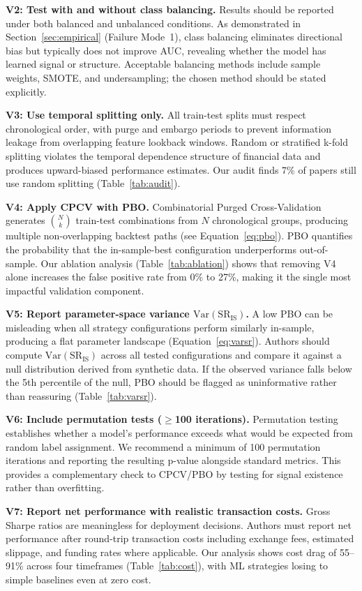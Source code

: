 \documentclass[preprint,12pt,authoryear]{elsarticle}
\begin{document}
\textbf{V2: Test with and without class balancing.}
Results should be reported under both balanced and unbalanced conditions. As demonstrated in Section~\ref{sec:empirical} (Failure Mode~1), class balancing eliminates directional bias but typically does not improve AUC, revealing whether the model has learned signal or structure. Acceptable balancing methods include sample weights, SMOTE, and undersampling; the chosen method should be stated explicitly.

\textbf{V3: Use temporal splitting only.}
All train-test splits must respect chronological order, with purge and embargo periods to prevent information leakage from overlapping feature lookback windows. Random or stratified k-fold splitting violates the temporal dependence structure of financial data and produces upward-biased performance estimates. Our audit finds 7\% of papers still use random splitting (Table~\ref{tab:audit}).

\textbf{V4: Apply CPCV with PBO.}
Combinatorial Purged Cross-Validation generates $\binom{N}{k}$ train-test combinations from $N$ chronological groups, producing multiple non-overlapping backtest paths (see Equation~\ref{eq:pbo}). PBO quantifies the probability that the in-sample-best configuration underperforms out-of-sample. Our ablation analysis (Table~\ref{tab:ablation}) shows that removing V4 alone increases the false positive rate from 0\% to 27\%, making it the single most impactful validation component.

\textbf{V5: Report parameter-space variance $\mathrm{Var}(\mathrm{SR}_{\mathrm{IS}})$.}
A low PBO can be misleading when all strategy configurations perform similarly in-sample, producing a flat parameter landscape (Equation~\ref{eq:varsr}). Authors should compute $\mathrm{Var}(\mathrm{SR}_{\mathrm{IS}})$ across all tested configurations and compare it against a null distribution derived from synthetic data. If the observed variance falls below the 5th percentile of the null, PBO should be flagged as uninformative rather than reassuring (Table~\ref{tab:varsr}).

\textbf{V6: Include permutation tests ($\geq$100 iterations).}
Permutation testing establishes whether a model's performance exceeds what would be expected from random label assignment. We recommend a minimum of 100 permutation iterations and reporting the resulting p-value alongside standard metrics. This provides a complementary check to CPCV/PBO by testing for signal existence rather than overfitting.

\textbf{V7: Report net performance with realistic transaction costs.}
Gross Sharpe ratios are meaningless for deployment decisions. Authors must report net performance after round-trip transaction costs including exchange fees, estimated slippage, and funding rates where applicable. Our analysis shows cost drag of 55--91\% across four timeframes (Table~\ref{tab:cost}), with ML strategies losing to simple baselines even at zero cost.
\end{document}
